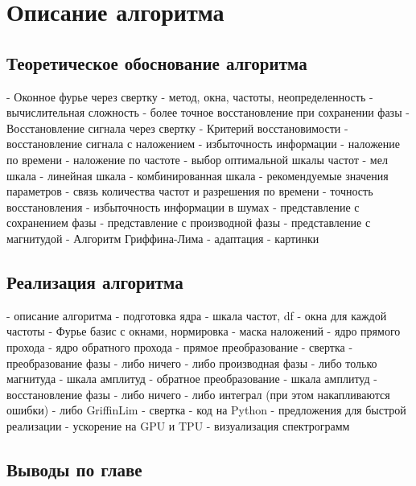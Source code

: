 \chapter{Описание алгоритма}
\label{cha:ch_2}

\section{Теоретическое обоснование алгоритма}
 - Оконное фурье через свертку
   - метод, окна, частоты, неопределенность
   - вычислительная сложность
 - более точное восстановление при сохранении фазы
 - Восстановление сигнала через свертку
 - Критерий восстановимости
 - восстановление сигнала с наложением
 - избыточность информации
 - наложение по времени
 - наложение по частоте
 - выбор оптимальной шкалы частот
   - мел шкала
   - линейная шкала
   - комбинированная шкала
 - рекомендуемые значения параметров
 - связь количества частот и разрешения по времени
 - точность восстановления
 - избыточность информации в шумах
 - представление с сохранением фазы
 - представление с производной фазы
 - представление с магнитудой
 - Алгоритм Гриффина-Лима
  - адаптация
 - картинки

\section{Реализация алгоритма}
 - описание алгоритма
   - подготовка ядра
     - шкала частот, df
	 - окна для каждой частоты
	 - Фурье базис с окнами, нормировка
	 - маска наложений
	 - ядро прямого прохода
	 - ядро обратного прохода
   - прямое преобразование
     - свертка
	 - преобразование фазы
	   - либо ничего
	   - либо производная фазы
	   - либо только магнитуда
	 - шкала амплитуд
   - обратное преобразование
     - шкала амплитуд
	 - восстановление фазы
	   - либо ничего
	   - либо интеграл (при этом накапливаются ошибки)
	   - либо GriffinLim
	 - свертка
 - код на Python
 - предложения для быстрой реализации
 - ускорение на GPU и TPU
 - визуализация спектрограмм

\section{Выводы по главе}
